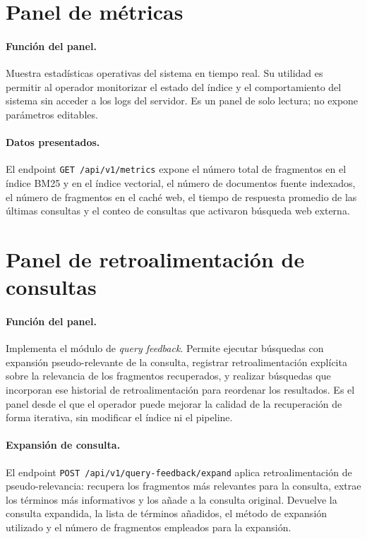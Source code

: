 \documentclass[11pt]{article}
\begin{document}
\section{Panel de métricas}

\paragraph{Función del panel.}
Muestra estadísticas operativas del sistema en tiempo real. Su utilidad es permitir al
operador monitorizar el estado del índice y el comportamiento del sistema sin acceder a los
logs del servidor. Es un panel de solo lectura; no expone parámetros editables.

\paragraph{Datos presentados.}
El endpoint \texttt{GET /api/v1/metrics} expone el número total de fragmentos en el índice
BM25 y en el índice vectorial, el número de documentos fuente indexados, el número de
fragmentos en el caché web, el tiempo de respuesta promedio de las últimas consultas y el
conteo de consultas que activaron búsqueda web externa.

\section{Panel de retroalimentación de consultas}

\paragraph{Función del panel.}
Implementa el módulo de \emph{query feedback}. Permite ejecutar búsquedas con expansión
pseudo-relevante de la consulta, registrar retroalimentación explícita sobre la relevancia
de los fragmentos recuperados, y realizar búsquedas que incorporan ese historial de
retroalimentación para reordenar los resultados. Es el panel desde el que el operador puede
mejorar la calidad de la recuperación de forma iterativa, sin modificar el índice ni el
pipeline.

\paragraph{Expansión de consulta.}
El endpoint \texttt{POST /api/v1/query-feedback/expand} aplica retroalimentación de
pseudo-relevancia: recupera los fragmentos más relevantes para la consulta, extrae los
términos más informativos y los añade a la consulta original. Devuelve la consulta expandida,
la lista de términos añadidos, el método de expansión utilizado y el número de fragmentos
empleados para la expansión.
\end{document}
